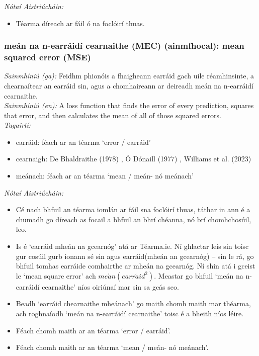 \documentclass{article}
\begin{document}
 \noindent \textit{Nótaí Aistriúcháin:}
\begin{itemize}
	\item Téarma díreach ar fáil ó na foclóirí thuas.
\end{itemize}


\subsubsection*{meán na n-earráidí cearnaithe (MEC) (ainmfhocal): mean squared error (MSE)}
 \noindent \textit{Sainmhíniú (ga):} Feidhm phionóis a fhaigheann earráid gach uile réamhinsinte, a chearnaítear an earráid sin, agus a chomhaireann ar deireadh meán na n-earráidí cearnaithe.
\\
 \noindent \textit{Sainmhíniú (en):} A loss function that finds the error of every prediction, squares that error, and then calculates the mean of all of those squared errors.
\\
 \noindent \textit{Tagairtí:}
\begin{itemize}
	\item earráid: féach ar an téarma `error / earráid'
	\item cearnaigh: De Bhaldraithe (1978) \cite{de-bhaldraithe}, Ó Dónaill (1977) \cite{odonaill}, Williams et al. (2023) \cite{storchiste}
	\item meánach: féach ar an téarma `mean / meán- nó meánach'
\end{itemize}

 \noindent \textit{Nótaí Aistriúcháin:}
\begin{itemize}
	\item Cé nach bhfuil an téarma iomlán ar fáil sna foclóirí thuas, táthar in ann é a chumadh go díreach as focail a bhfuil an bhrí chéanna, nó brí chomhchosúil, leo.
	\item Is é `earráid mheán na gcearnóg' atá ar Téarma.ie. Ní ghlactar leis sin toisc gur cosúil gurb ionann sé sin agus earráid(mheán an gcearnóg) -- sin le rá, go bhfuil tomhas earráide comhairthe ar mheán na gcearnóg. Ní shin atá i gceist le `mean square error' ach $me\acute{a}n(earr\acute{a}id^2)$. Meastar go bhfuil `meán na n-earráidí cearnaithe' níos oiriúnaí mar sin sa gcás seo.
	\item Beadh `earráid chearnaithe mheánach' go maith chomh maith mar théarma, ach roghnaíodh `meán na n-earráidí cearnaithe' toisc é a bheith níos léire.
	\item Féach chomh maith ar an téarma `error / earráid'.
	\item Féach chomh maith ar an téarma `mean / meán- nó meánach'.
\end{itemize}
\end{document}
